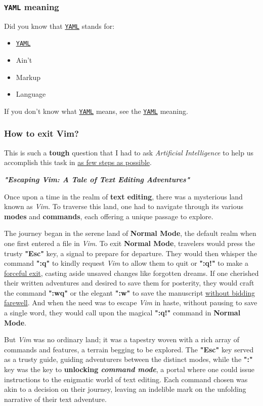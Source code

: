 \subsubsection{\texttt{YAML} meaning}
\hypertarget{sssec:yaml}{}
Did you know that \hyperlink{sssec:yaml}{\texttt{YAML}} stands for:
\begin{itemize}[label=$\star$]
    \item \hyperlink{sssec:yaml}{\texttt{YAML}}
    \item Ain't
    \item Markup
    \item Language
\end{itemize}

\noindent
If you don't know what \hyperlink{sssec:yaml}{\texttt{YAML}} means, see the \hyperlink{sssec:yaml}{\texttt{YAML}} meaning.

\subsubsection{How to exit Vim?}
This is such a \textbf{tough} question that I had to ask \textit{Artificial Intelligence} to help us accomplish this task in \underline{as few steps as possible}.
\vspace{12pt}

\centerline{\textbf{\textit{"Escaping Vim: A Tale of Text Editing Adventures"}}}
\vspace{4pt}
Once upon a time in the realm of \textbf{text editing}, there was a mysterious land known as \textit{Vim}. To traverse this land, one had to navigate through its various \textbf{modes} and \textbf{commands}, each offering a unique passage to explore.

The journey began in the serene land of \textbf{Normal Mode}, the default realm when one first entered a file in \textit{Vim}. To exit \textbf{Normal Mode}, travelers would press the trusty \textbf{"Esc"} key, a signal to prepare for departure. They would then whisper the command \textbf{":q"} to kindly request \textit{Vim} to allow them to quit or \textbf{":q!"} to make a \underline{forceful exit}, casting aside unsaved changes like forgotten dreams. If one cherished their written adventures and desired to save them for posterity, they would craft the command \textbf{":wq"} or the elegant \textbf{":w"} to save the manuscript \underline{without bidding farewell}. And when the need was to escape \textit{Vim} in haste, without pausing to save a single word, they would call upon the magical \textbf{":q!"} command in \textbf{Normal Mode}.

But \textit{Vim} was no ordinary land; it was a tapestry woven with a rich array of commands and features, a terrain begging to be explored. The \textbf{"Esc"} key served as a trusty guide, guiding adventurers between the distinct modes, while the \textbf{":"} key was the key to \textbf{unlocking \emph{command mode}}, a portal where one could issue instructions to the enigmatic world of text editing. Each command chosen was akin to a decision on their journey, leaving an indelible mark on the unfolding narrative of their text adventure.